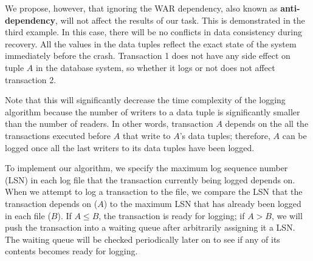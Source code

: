 We propose, however, that ignoring the WAR dependency, also known as  \textbf{anti-dependency}, will not affect the results of our task. This is demonstrated in the third example. In this case, there will be no conflicts in data consistency during recovery. All the values in the data tuples reflect the exact state of the system immediately before the crash. Transaction 1 does not have any side effect on tuple $A$ in the database system, so whether it logs or not does not affect transaction 2.\par

Note that this will significantly decrease the time complexity of the logging algorithm because the number of writers to a data tuple is significantly smaller than the number of readers. In other words, transaction $A$ depends on the all the transactions executed before $A$ that write to $A$'s data tuples; therefore, $A$ can be logged once all the last writers to its data tuples have been logged. \par

To implement our algorithm, we specify the maximum log sequence number (LSN) in each log file that the transaction currently being logged depends on. When we attempt to log a transaction to the file, we compare the LSN that the transaction depends on ($A$) to the maximum LSN that has already been logged in each file ($B$). If $A\leq B$, the transaction is ready for logging; if $A>B$, we will push the transaction into a waiting queue after arbitrarily assigning it a LSN. The waiting queue will be checked periodically later on to see if any of its contents becomes ready for logging.\par


